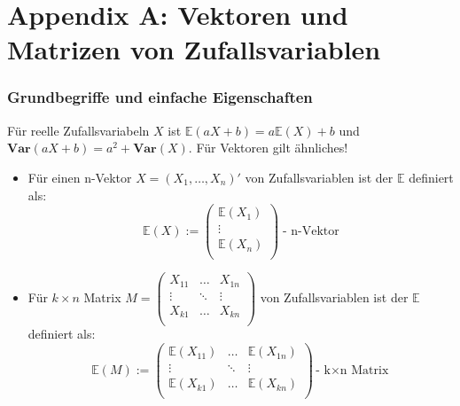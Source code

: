 \documentclass[10pt]{article}
\newcommand{\FZV}{X_1, \ldots, X_n} %
\newcommand{\EW}{\mathbb{E}} %
\newcommand{\Var}{\textbf{Var}} %
\begin{document}
			\newpage
			\part{Appendix A: Vektoren und Matrizen von Zufallsvariablen}
			\section{Grundbegriffe und einfache Eigenschaften}
			Für reelle Zufallsvariabeln $X$ ist $\EW (a X + b) = a \EW(X) + b$ und $\Var(aX+b) = a^2 + \Var (X)$. Für Vektoren gilt ähnliches!
			\begin{Definition}
				\begin{itemize}
					\item Für einen n-Vektor $X=(\FZV)'$ von Zufallsvariablen ist der $\EW$ definiert als:
					\begin{equation*}
						\EW (X) := \left(
						\begin{array}{c}
							\EW(X_1)\\
							\vdots\\
							\EW(X_n)\\
						\end{array}
						\right)\; \text{- n-Vektor}
					\end{equation*}
					\item Für $k \times n$ Matrix $M =
					\begin{pmatrix}
						X_{11} & \ldots & X_{1n}\\
						\vdots & \ddots & \vdots\\
						X_{k1} & \ldots & X_{kn}\\
					\end{pmatrix}$ von Zufallsvariablen ist der $\EW$ definiert als:
					\begin{equation*}
						\EW(M):= 	\begin{pmatrix}
							\EW(X_{11}) & \ldots & \EW(X_{1n})\\
							\vdots & \ddots & \vdots\\
							\EW(X_{k1}) & \ldots & \EW(X_{kn})\\
						\end{pmatrix} \text{- k$\times$n Matrix}
					\end{equation*}
				\end{itemize}
			\end{Definition}
			
\end{document}
